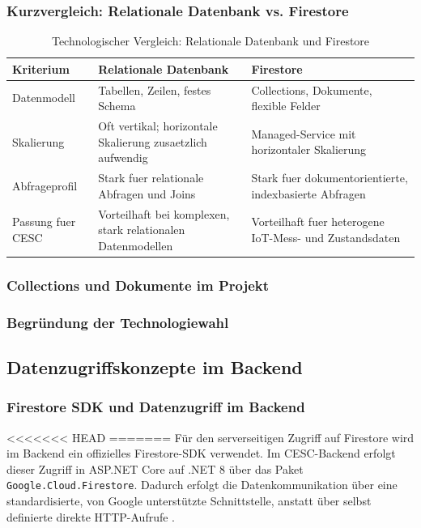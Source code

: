 \subsubsection{Kurzvergleich: Relationale Datenbank vs. Firestore}
\begin{table}[H]
    \centering
    \begin{tabular}{|p{3.2cm}|p{5cm}|p{5cm}|}
        \hline
        \textbf{Kriterium} & \textbf{Relationale Datenbank} & \textbf{Firestore} \\
        \hline
        Datenmodell & Tabellen, Zeilen, festes Schema & Collections, Dokumente, flexible Felder \\
        \hline
        Skalierung & Oft vertikal; horizontale Skalierung zusaetzlich aufwendig & Managed-Service mit horizontaler Skalierung \\
        \hline
        Abfrageprofil & Stark fuer relationale Abfragen und Joins & Stark fuer dokumentorientierte, indexbasierte Abfragen \\
        \hline
        Passung fuer CESC & Vorteilhaft bei komplexen, stark relationalen Datenmodellen & Vorteilhaft fuer heterogene IoT-Mess- und Zustandsdaten \\
        \hline
    \end{tabular}
    \caption{Technologischer Vergleich: Relationale Datenbank und Firestore}
    \label{tab:db-relational-vs-firestore}
\end{table}

\subsubsection{Collections und Dokumente im Projekt}

\subsubsection{Begründung der Technologiewahl}

\subsection{Datenzugriffskonzepte im Backend}

\subsubsection{Firestore SDK und Datenzugriff im Backend}

<<<<<<< HEAD
=======
Für den serverseitigen Zugriff auf Firestore wird im Backend ein offizielles Firestore-SDK verwendet. Im CESC-Backend erfolgt dieser Zugriff in ASP.NET Core auf .NET 8 über das Paket \texttt{Google.Cloud.Firestore}. Dadurch erfolgt die Datenkommunikation über eine standardisierte, von Google unterstützte Schnittstelle, anstatt über selbst definierte direkte HTTP-Aufrufe \cite{firestore_dotnet_sdk}.


